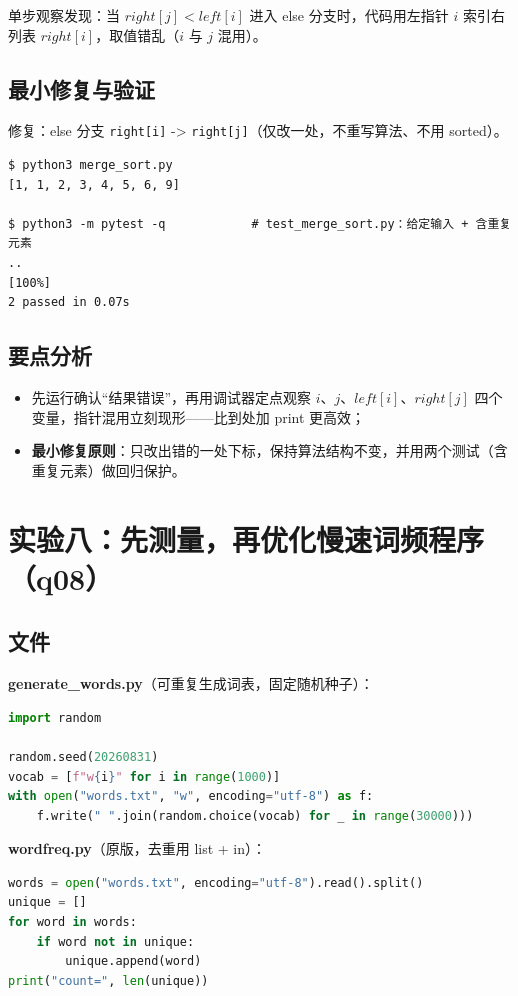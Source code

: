 \documentclass[UTF8,fontset=ubuntu]{ctexart}
\begin{document}
单步观察发现：当 $right[j] < left[i]$ 进入 else 分支时，代码用左指针 $i$ 索引右列表 $right[i]$，取值错乱（$i$ 与 $j$ 混用）。

\subsection{最小修复与验证}
修复：else 分支 \lstinline|right[i]| -> \lstinline|right[j]|（仅改一处，不重写算法、不用 sorted）。
\begin{lstlisting}
$ python3 merge_sort.py
[1, 1, 2, 3, 4, 5, 6, 9]

$ python3 -m pytest -q            # test_merge_sort.py：给定输入 + 含重复元素
..                                                                       [100%]
2 passed in 0.07s
\end{lstlisting}

\subsection{要点分析}
\begin{itemize}
\item 先运行确认“结果错误”，再用调试器定点观察 $i$、$j$、$left[i]$、$right[j]$ 四个变量，指针混用立刻现形——比到处加 print 更高效；
\item \textbf{最小修复原则}：只改出错的一处下标，保持算法结构不变，并用两个测试（含重复元素）做回归保护。
\end{itemize}

\section{实验八：先测量，再优化慢速词频程序（q08）}

\subsection{文件}
\textbf{generate\_words.py}（可重复生成词表，固定随机种子）：
\begin{lstlisting}[language=Python]
import random

random.seed(20260831)
vocab = [f"w{i}" for i in range(1000)]
with open("words.txt", "w", encoding="utf-8") as f:
    f.write(" ".join(random.choice(vocab) for _ in range(30000)))
\end{lstlisting}

\textbf{wordfreq.py}（原版，去重用 list + in）：
\begin{lstlisting}[language=Python]
words = open("words.txt", encoding="utf-8").read().split()
unique = []
for word in words:
    if word not in unique:
        unique.append(word)
print("count=", len(unique))
\end{lstlisting}
\end{document}
